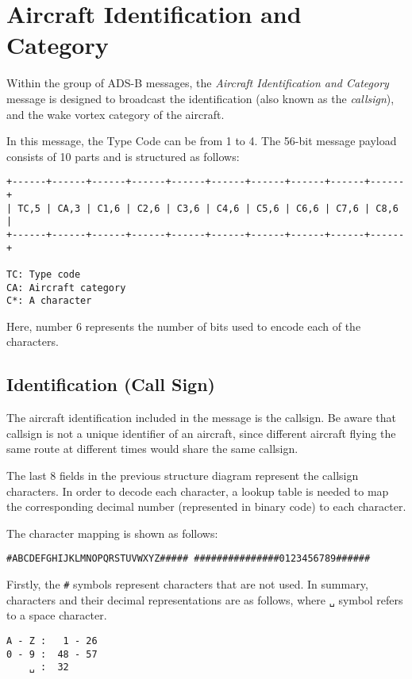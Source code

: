 \chapter{Aircraft Identification and Category}

Within the group of ADS-B messages, the \emph{Aircraft Identification and Category} message is designed to broadcast the identification (also known as the \emph{callsign}), and the wake vortex category of the aircraft.

In this message, the Type Code can be from 1 to 4. The 56-bit message payload consists of 10 parts and is structured as follows:

\begin{verbatim}
+------+------+------+------+------+------+------+------+------+------+
| TC,5 | CA,3 | C1,6 | C2,6 | C3,6 | C4,6 | C5,6 | C6,6 | C7,6 | C8,6 |
+------+------+------+------+------+------+------+------+------+------+

TC: Type code
CA: Aircraft category
C*: A character
\end{verbatim}

Here, number 6 represents the number of bits used to encode each of the characters.

\section{Identification (Call Sign)}
The aircraft identification included in the message is the callsign. Be aware that callsign is not a unique identifier of an aircraft, since different aircraft flying the same route at different times would share the same callsign.

The last 8 fields in the previous structure diagram represent the callsign characters. In order to decode each character, a lookup table is needed to map the corresponding decimal number (represented in binary code) to each character.

The character mapping is shown as follows:

\begin{verbatim}
#ABCDEFGHIJKLMNOPQRSTUVWXYZ##### ###############0123456789######
\end{verbatim}

Firstly, the \texttt{\#} symbols represent characters that are not used. In summary, characters and their decimal representations are as follows, where  \texttt{␣} symbol refers to a space character. 

\begin{verbatim}
A - Z :   1 - 26
0 - 9 :  48 - 57
    ␣ :  32
\end{verbatim}


